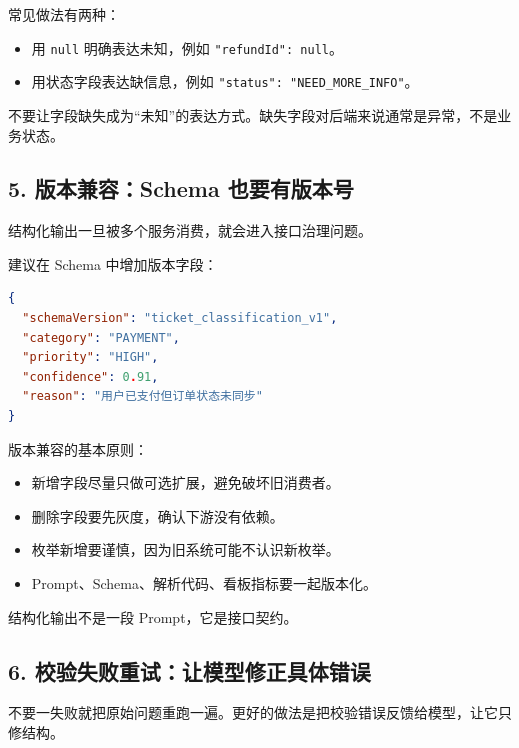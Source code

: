 \documentclass[9pt,a4paper,twocolumn]{ctexart}
\begin{document}
常见做法有两种：


\begin{itemize}[itemsep=1pt, topsep=2pt]
  \item 用 \texttt{null} 明确表达未知，例如 \texttt{"refundId": null}。
  \item 用状态字段表达缺信息，例如 \texttt{"status": "NEED\_MORE\_INFO"}。
\end{itemize}


不要让字段缺失成为“未知”的表达方式。缺失字段对后端来说通常是异常，不是业务状态。



\subsection*{5. 版本兼容：Schema 也要有版本号}


结构化输出一旦被多个服务消费，就会进入接口治理问题。



建议在 Schema 中增加版本字段：



\begin{lstlisting}[language=json]
{
  "schemaVersion": "ticket_classification_v1",
  "category": "PAYMENT",
  "priority": "HIGH",
  "confidence": 0.91,
  "reason": "用户已支付但订单状态未同步"
}
\end{lstlisting}



版本兼容的基本原则：


\begin{itemize}[itemsep=1pt, topsep=2pt]
  \item 新增字段尽量只做可选扩展，避免破坏旧消费者。
  \item 删除字段要先灰度，确认下游没有依赖。
  \item 枚举新增要谨慎，因为旧系统可能不认识新枚举。
  \item Prompt、Schema、解析代码、看板指标要一起版本化。
\end{itemize}


结构化输出不是一段 Prompt，它是接口契约。



\subsection*{6. 校验失败重试：让模型修正具体错误}


不要一失败就把原始问题重跑一遍。更好的做法是把校验错误反馈给模型，让它只修结构。
\end{document}
